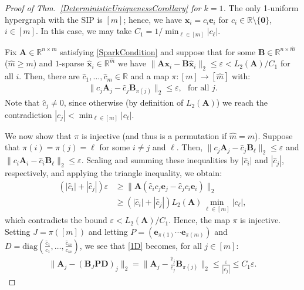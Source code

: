 \documentclass[9pt,twocolumn]{pnas-new}
\begin{document}
\begin{proof}[Proof of Thm.~\ref{DeterministicUniquenessCorollary} for $k=1$]
The only 1-uniform hypergraph with the SIP is $[m]$; hence, we have $\mathbf{x}_i = c_i \mathbf{e}_i$ for $c_i \in \mathbb{R} \setminus \{\mathbf{0}\}$, $i \in [m]$. In this case, we may take $C_1 = 1/ \min_{\ell \in [m]} |c_{\ell}|$. 

Fix $\mathbf{A} \in \mathbb{R}^{n \times m}$ satisfying \eqref{SparkCondition} and suppose that for some $\mathbf{B} \in \mathbb{R}^{n \times \hat m}$ ($\hat m \geq m$) and $1$-sparse $\mathbf{\hat x}_i \in \mathbb{R}^{\hat m}$ we have  $\|\mathbf{A}\mathbf{x}_i - \mathbf{B}\mathbf{\hat x}_i\|_2 \leq \varepsilon < L_2(\mathbf{A}) / C_1$ for all $i$. Then, there are $\hat{c}_1, \ldots, \hat{c}_m \in \mathbb{R}$ and a map $\pi: [m] \to [\hat m]$ with:
\begin{align}\label{1D}
\|c_j\mathbf{A}_j - \hat{c}_j\mathbf{B}_{\pi(j)}\|_2 \leq \varepsilon,\ \ \   \text{for all $j$}.
\end{align} 
Note that $\hat{c}_j \neq 0$, since otherwise (by definition of $L_2(\mathbf{A})$) we reach the contradiction $|c_j| < \min_{\ell \in [m]} | c_\ell |$. %

We  now show that $\pi$ is injective (and thus is a permutation if $\hat m = m$). Suppose that $\pi(i) = \pi(j) = \ell$ for some $i \neq j$ and $\ell$. Then, $\|c_{j}\mathbf{A}_{j} - \hat{c}_{j}\mathbf{B}_{\ell}\|_2 \leq \varepsilon$ and $\|c_{i}\mathbf{A}_{i} - \hat{c}_{i} \mathbf{B}_{\ell}\|_2  \leq \varepsilon$. Scaling and summing these inequalities by $|\hat{c}_{i}|$ and $|\hat{c}_{j}|$, respectively, and applying the triangle inequality, we obtain:
\begin{align*}%
(|\hat{c}_{i}| + |\hat{c}_{j}|) \varepsilon
&\geq\|\mathbf{A}(\hat{c}_{i}c_{j} \mathbf{e}_{j} - \hat{c}_{j}c_{i}\mathbf{e}_{i})\|_2 \nonumber \\ 
&\geq  \left( |\hat{c}_{i}| + |\hat{c}_{j}| \right) L_2(\mathbf{A}) \min_{\ell \in [m]} |c_\ell |,
\end{align*}
%
which contradicts the bound $\varepsilon < L_2(\mathbf{A})/C_1$. Hence, the map $\pi$ is injective. Setting $J = \pi([m])$ and letting $P = \left( \mathbf{e}_{\pi(1)} \cdots \mathbf{e}_{\pi(m)}\right)$ and $D = \text{diag}(\frac{\hat{c}_1}{c_1},\ldots,\frac{\hat{c}_m}{c_m})$, we see that \eqref{1D} becomes, for all $j \in [m]$:
\begin{align*}%
\|\mathbf{A}_j - (\mathbf{B}_J\mathbf{PD})_j\|_2 
= \|\mathbf{A}_j - \frac{\hat{c}_j}{c_j}\mathbf{B}_{\pi(j)}\|_2 
\leq \frac{\varepsilon}{|c_j|} 
\leq C_1\varepsilon.
\end{align*}
\end{proof}
\end{document}
